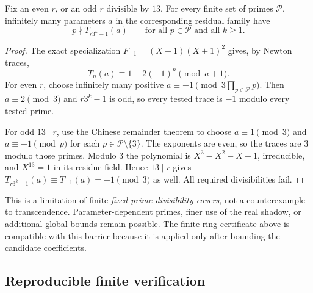 \documentclass[11pt,a4paper]{article}
\theoremstyle{definition}\newtheorem{definition}[theorem]{Definition}
\theoremstyle{remark}\newtheorem{remark}[theorem]{Remark}
\begin{document}
\begin{proposition}
Fix an even $r$, or an odd $r$ divisible by $13$. For every finite
set of primes $\mathcal P$, infinitely many parameters $a$ in the
corresponding residual family have
\[
 p\nmid T_{r3^k-1}(a)\qquad
 \text{for all }p\in\mathcal P\text{ and all }k\ge1.
\]
\end{proposition}
\begin{proof}
The exact specialization
$F_{-1}=(X-1)(X+1)^2$ gives, by Newton traces,
\begin{equation}\label{N01:eq:barrier}
 T_n(a)\equiv1+2(-1)^n\pmod{a+1}.
\end{equation}
For even $r$, choose infinitely many positive
$a\equiv-1\pmod{3\prod_{p\in\mathcal P}p}$. Then
$a\equiv2\pmod3$ and $r3^k-1$ is odd, so every tested trace is
$-1$ modulo every tested prime.

For odd $13\mid r$, use the Chinese remainder theorem to choose
$a\equiv1\pmod3$ and $a\equiv-1\pmod p$ for each
$p\in\mathcal P\setminus\{3\}$. The exponents are even, so the
traces are $3$ modulo those primes. Modulo $3$ the polynomial is
$X^3-X^2-X-1$, irreducible, and $X^{13}=1$ in its residue field.
Hence $13\mid r$ gives
$T_{r3^k-1}(a)\equiv T_{-1}(a)=-1\pmod3$ as well.
All required divisibilities fail.
\end{proof}

This is a limitation of finite \emph{fixed-prime divisibility covers},
not a counterexample to transcendence. Parameter-dependent primes,
finer use of the real shadow, or additional global bounds remain
possible. The finite-ring certificate above is compatible with this
barrier because it is applied only after bounding the candidate
coefficients.


\subsection{Reproducible finite verification}\label{N01:app:verification}
\end{document}
